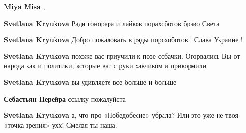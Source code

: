 \begin{itemize}
\begin{itemize}
\textbf{Miya Misa} ,👍🏻😀

 
\textbf{Svetlana Kryukova} Ради гонорара и лайков порахоботов браво Света

 
\textbf{Svetlana Kryukova} Добро пожаловать в ряды порохоботов ! Слава Украине !

 
\textbf{Svetlana Kryukova} похоже вас приучили к позе собачки.
Оторвались Вы от народа как и политики, которые вас с руки хавчиком и прикормили

 
\textbf{Svetlana Kryukova} вы удивляете все больше и больше

 
\textbf{Себастьян Перейра} ссылку пожалуйста

 
\textbf{Svetlana Kryukova} а, что про «Победобесие» убрала? Или это уже не твоя «точка зрения» ухх! Смелая ты наша.

 

\end{itemize}
\end{itemize}

